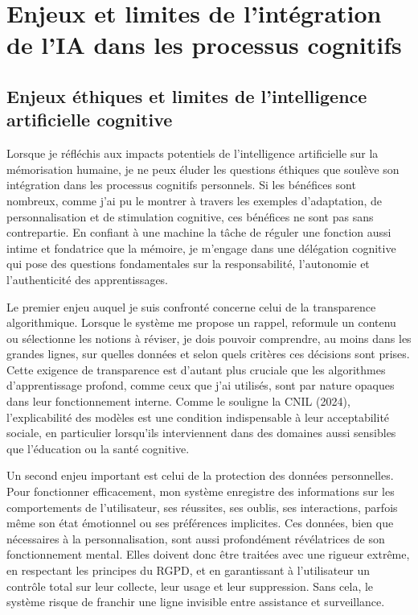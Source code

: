 \documentclass[11pt,a4paper]{report}
\begin{document}
\section{Enjeux et limites de l’intégration de l’IA dans les processus cognitifs}

\subsection{Enjeux éthiques et limites de l’intelligence artificielle cognitive}

Lorsque je réfléchis aux impacts potentiels de l’intelligence artificielle sur la mémorisation humaine, je ne peux éluder les questions éthiques que soulève son intégration dans les processus cognitifs personnels. Si les bénéfices sont nombreux, comme j’ai pu le montrer à travers les exemples d’adaptation, de personnalisation et de stimulation cognitive, ces bénéfices ne sont pas sans contrepartie. En confiant à une machine la tâche de réguler une fonction aussi intime et fondatrice que la mémoire, je m’engage dans une délégation cognitive qui pose des questions fondamentales sur la responsabilité, l’autonomie et l’authenticité des apprentissages.

Le premier enjeu auquel je suis confronté concerne celui de la transparence algorithmique. Lorsque le système me propose un rappel, reformule un contenu ou sélectionne les notions à réviser, je dois pouvoir comprendre, au moins dans les grandes lignes, sur quelles données et selon quels critères ces décisions sont prises. Cette exigence de transparence est d’autant plus cruciale que les algorithmes d’apprentissage profond, comme ceux que j’ai utilisés, sont par nature opaques dans leur fonctionnement interne. Comme le souligne la CNIL (2024), l’explicabilité des modèles est une condition indispensable à leur acceptabilité sociale, en particulier lorsqu’ils interviennent dans des domaines aussi sensibles que l’éducation ou la santé cognitive.

Un second enjeu important est celui de la protection des données personnelles. Pour fonctionner efficacement, mon système enregistre des informations sur les comportements de l’utilisateur, ses réussites, ses oublis, ses interactions, parfois même son état émotionnel ou ses préférences implicites. Ces données, bien que nécessaires à la personnalisation, sont aussi profondément révélatrices de son fonctionnement mental. Elles doivent donc être traitées avec une rigueur extrême, en respectant les principes du RGPD, et en garantissant à l’utilisateur un contrôle total sur leur collecte, leur usage et leur suppression. Sans cela, le système risque de franchir une ligne invisible entre assistance et surveillance.
\end{document}
